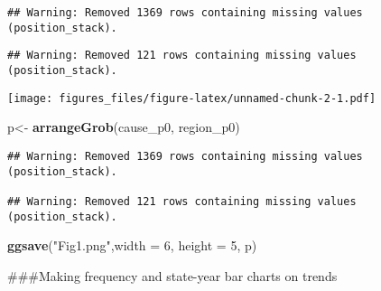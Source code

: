 \documentclass[
]{article}
\newenvironment{Shaded}{\begin{snugshade}}{\end{snugshade}}
\newcommand{\CommentTok}[1]{\textcolor[rgb]{0.56,0.35,0.01}{\textit{#1}}}
\newcommand{\DataTypeTok}[1]{\textcolor[rgb]{0.13,0.29,0.53}{#1}}
\newcommand{\DecValTok}[1]{\textcolor[rgb]{0.00,0.00,0.81}{#1}}
\newcommand{\KeywordTok}[1]{\textcolor[rgb]{0.13,0.29,0.53}{\textbf{#1}}}
\newcommand{\NormalTok}[1]{#1}
\newcommand{\OperatorTok}[1]{\textcolor[rgb]{0.81,0.36,0.00}{\textbf{#1}}}
\newcommand{\StringTok}[1]{\textcolor[rgb]{0.31,0.60,0.02}{#1}}
\begin{document}
\begin{verbatim}
## Warning: Removed 1369 rows containing missing values (position_stack).
\end{verbatim}

\begin{verbatim}
## Warning: Removed 121 rows containing missing values (position_stack).
\end{verbatim}

\texttt{[image: figures\_files/figure-latex/unnamed-chunk-2-1.pdf]}

\begin{Shaded}
\begin{Highlighting}[]
\NormalTok{p<-}\StringTok{ }\KeywordTok{arrangeGrob}\NormalTok{(cause_p0, region_p0)}
\end{Highlighting}
\end{Shaded}

\begin{verbatim}
## Warning: Removed 1369 rows containing missing values (position_stack).

## Warning: Removed 121 rows containing missing values (position_stack).
\end{verbatim}

\begin{Shaded}
\begin{Highlighting}[]
\KeywordTok{ggsave}\NormalTok{(}\StringTok{"Fig1.png"}\NormalTok{,}\DataTypeTok{width =} \DecValTok{6}\NormalTok{, }\DataTypeTok{height =} \DecValTok{5}\NormalTok{, p)}
\end{Highlighting}
\end{Shaded}

\#\#\#Making frequency and state-year bar charts on trends

\begin{Shaded}
\end{Shaded}
\end{document}
